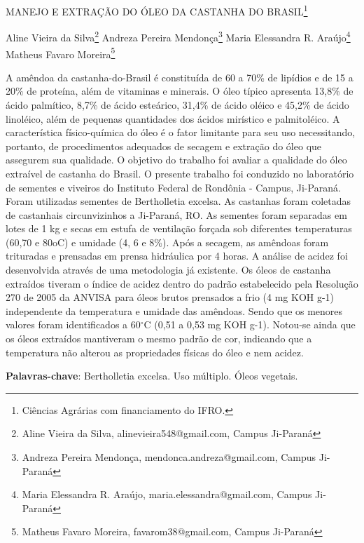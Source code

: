 \documentclass[article,12pt,onesidea,4paper,english,brazil]{abntex2}
\begin{document}
	
	
	\frenchspacing 
	
	\begin{center}
		\LARGE MANEJO E EXTRAÇÃO DO ÓLEO DA CASTANHA DO BRASIL\footnote{Ciências Agrárias com financiamento do IFRO.}
		
		\normalsize
		Aline Vieira da Silva\footnote{Aline Vieira da Silva, alinevieira548@gmail.com, Campus Ji-Paraná} 
		Andreza Pereira Mendonça\footnote{Andreza Pereira Mendonça, mendonca.andreza@gmail.com, Campus Ji-Paraná} 
		Maria Elessandra R. Araújo\footnote{Maria Elessandra R. Araújo, maria.elessandra@gmail.com, Campus Ji-Paraná} 
		Matheus Favaro
		Moreira\footnote{Matheus Favaro Moreira, favarom38@gmail.com, Campus Ji-Paraná} 
	\end{center}
	
	\noindent A amêndoa da castanha-do-Brasil é constituída de 60 a 70\% de lipídios e de 15 a
	20\% de proteína, além de vitaminas e minerais. O óleo típico apresenta 13,8\% de
	ácido palmítico, 8,7\% de ácido esteárico, 31,4\% de ácido oléico e 45,2\% de ácido
	linoléico, além de pequenas quantidades dos ácidos mirístico e palmitoléico. A
	característica físico-química do óleo é o fator limitante para seu uso necessitando,
	portanto, de procedimentos adequados de secagem e extração do óleo que
	assegurem sua qualidade. O objetivo do trabalho foi avaliar a qualidade do óleo
	extraível de castanha do Brasil. O presente trabalho foi conduzido no laboratório de
	sementes e viveiros do Instituto Federal de Rondônia - Campus, Ji-Paraná. Foram
	utilizadas sementes de Bertholletia excelsa. As castanhas foram coletadas de
	castanhais circunvizinhos a Ji-Paraná, RO. As sementes foram separadas em lotes
	de 1 kg e secas em estufa de ventilação forçada sob diferentes temperaturas (60,70
	e 80oC) e umidade (4, 6 e 8\%). Após a secagem, as amêndoas foram trituradas e
	prensadas em prensa hidráulica por 4 horas. A análise de acidez foi desenvolvida
	através de uma metodologia já existente. Os óleos de castanha extraídos tiveram o
	índice de acidez dentro do padrão estabelecido pela Resolução 270 de 2005 da
	ANVISA para óleos brutos prensados a frio (4 mg KOH g-1) independente da temperatura e umidade das amêndoas. Sendo que os menores valores foram identificados a 60$^{\circ}$C (0,51 a 0,53 mg KOH g-1). Notou-se ainda que os óleos
	extraídos mantiveram o mesmo padrão de cor, indicando que a temperatura não
	alterou as propriedades físicas do óleo e nem acidez.
	
	\vspace{\onelineskip}
	
	\noindent
	\textbf{Palavras-chave}: Bertholletia excelsa. Uso múltiplo. Óleos vegetais.
	
\end{document}
